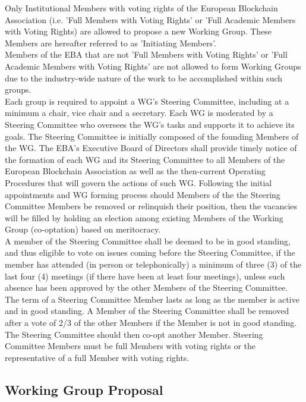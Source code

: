\documentclass{article}
\begin{document}
Only Institutional Members with voting rights of the European Blockchain Association (i.e. 'Full Members with Voting Rights' or 'Full Academic Members with Voting Rights) are allowed to propose a new Working Group. These Members are hereafter referred to as 'Initiating Members'. \\
Members of the EBA that are not 'Full Members with Voting Rights' or 'Full Academic Members with Voting Rights' are not allowed to form Working Groups due to the industry-wide nature of the work to be accomplished within such groups. \\ 
Each group is required to appoint a WG's Steering Committee, including at a minimum a chair, vice chair and a secretary.
 Each WG is moderated by a Steering Committee who oversees the WG's tasks and supports it to achieve its goals. 
 The Steering Committee is initially composed of the founding Members of the WG. 
 The EBA's Executive Board of Directors shall provide timely notice of the formation of each WG and its Steering Committee to all Members of the European Blockchain Association as well as the then-current Operating Procedures that will govern the actions of such WG. 
 Following the initial appointments and WG forming process should Members of the the Steering Committee Members be removed or relinquish their position, then the vacancies will be filled by holding an election among existing Members of the Working Group (co-optation) based on meritocracy. \\
A member of the Steering Committee shall be deemed to be in good standing, and thus eligible to vote on issues coming before the Steering Committee, if the member has attended (in person or telephonically) a minimum of three (3) of the last four (4) meetings (if there have been at least four meetings), unless such absence has been approved by the other Members of the Steering Committee. The term of a Steering Committee Member lasts as long as the member is active and in good standing. 
A Member of the Steering Committee shall be removed after a vote of 2/3 of the other Members if the Member is not in good standing. The Steering Committee should then co-opt another Member. 
Steering Committee Members must be full Members with voting rights or the representative of a full Member with voting rights.

\subsection{Working Group Proposal}
\end{document}
